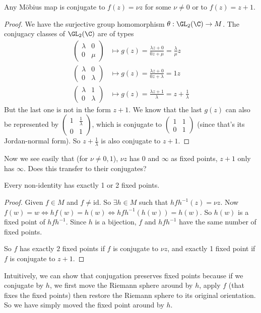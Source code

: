 \documentclass[a4pape]{article}
\begin{document}
\begin{prop}
Any M\"obius map is conjugate to $f(z) = \nu z$ for some $\nu\not= 0$ or to $f(z) = z + 1$.
\end{prop}

\begin{proof}
  We have the surjective group homomorphism $\theta: \GL_2(\C) \to M$. The conjugacy classes of $\GL_2(\C)$ are of types
  \begin{align*}
      \begin{pmatrix}
    \lambda & 0\\
    0 & \mu
  \end{pmatrix} &\mapsto g(z) = \frac{\lambda z + 0}{0z + \mu} = \frac{\lambda}{\mu}z\\
  \begin{pmatrix}
    \lambda & 0\\
    0 & \lambda
  \end{pmatrix} &\mapsto g(z) = \frac{\lambda z + 0}{0z + \lambda} = 1 z\\
  \begin{pmatrix}
    \lambda & 1\\
    0 & \lambda
  \end{pmatrix} &\mapsto g(z) = \frac{\lambda z + 1}{\lambda} = z + \frac{1}{\lambda}
  \end{align*}
  But the last one is not in the form $z + 1$. We know that the last $g(z)$ can also be represented by $
  \begin{pmatrix}
    1 & \frac{1}{\lambda}\\
    0 & 1
  \end{pmatrix}$, which is conjugate to $
  \begin{pmatrix}
    1 & 1\\
    0 & 1
  \end{pmatrix}$ (since that's its Jordan-normal form). So $z + \frac{1}{\lambda}$ is also conjugate to $z + 1$.
\end{proof}

Now we see easily that (for $\nu \not= 0, 1$), $\nu z$ has $0$ and $\infty$ as fixed points, $z + 1$ only has $\infty$. Does this transfer to their conjugates?

\begin{prop}
  Every non-identity has exactly 1 or 2 fixed points. 
\end{prop}

\begin{proof}
  Given $f\in M$ and $f\not= \mathrm{id}$. So $\exists h\in M$ such that $hfh^{-1}(z) = \nu{z}$. Now $f(w) = w \Leftrightarrow hf(w) = h(w) \Leftrightarrow hfh^{-1}(h(w)) = h(w)$. So $h(w)$ is a fixed point of $hfh^{-1}$. Since $h$ is a bijection, $f$ and $hfh^{-1}$ have the same number of fixed points.

  So $f$ has exactly $2$ fixed points if $f$ is conjugate to $\nu z$, and exactly 1 fixed point if $f$ is conjugate to $z + 1$.
\end{proof}
Intuitively, we can show that conjugation preserves fixed points because if we conjugate by $h$, we first move the Riemann sphere around by $h$, apply $f$ (that fixes the fixed points) then restore the Riemann sphere to its original orientation. So we have simply moved the fixed point around by $h$.
\end{document}
